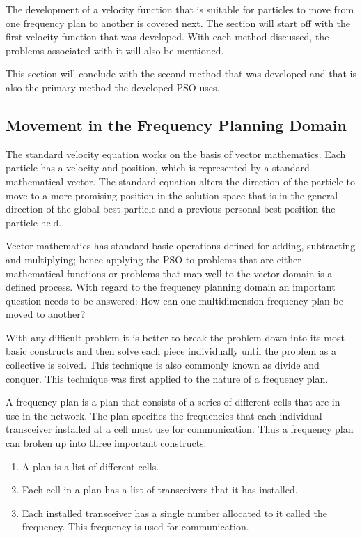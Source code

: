 The development of a velocity function that is suitable for particles to move from one frequency plan to another is covered next. The section will start off with the first velocity function that was developed. With each method discussed, the problems associated with it will also be mentioned. 

This section will conclude with the second method that was developed and that is also the primary method the developed PSO uses.

\subsection{Movement in the Frequency Planning Domain}
The standard velocity equation works on the basis of vector mathematics. Each particle has a velocity and position, which is represented by a standard mathematical vector. The standard equation alters the direction of the particle to move to a more promising position in the solution space that is in the general direction of the global best particle and a previous personal best position the particle held..

Vector mathematics has standard basic operations defined for adding, subtracting and multiplying; hence applying the PSO to problems that are either mathematical functions or problems that map well to the vector domain is a defined process. With regard to the frequency planning domain an important question needs to be answered: How can one multidimension frequency plan be moved to another?

With any difficult problem it is better to break the problem down into its most basic constructs and then solve each piece individually until the problem as a collective is solved. This technique is also commonly known as divide and conquer. This technique was first applied to the nature of a frequency plan.

A frequency plan is a plan that consists of a series of different cells that are in use in the network. The plan specifies the frequencies that each individual transceiver installed at a cell must use for communication. Thus a frequency plan can broken up into three important constructs:
\begin{enumerate}
\item A plan is a list of different cells.
\item Each cell in a plan has a list of transceivers that it has installed.
\item Each installed transceiver has a single number allocated to it called the frequency. This frequency is used for communication.
\end{enumerate}


